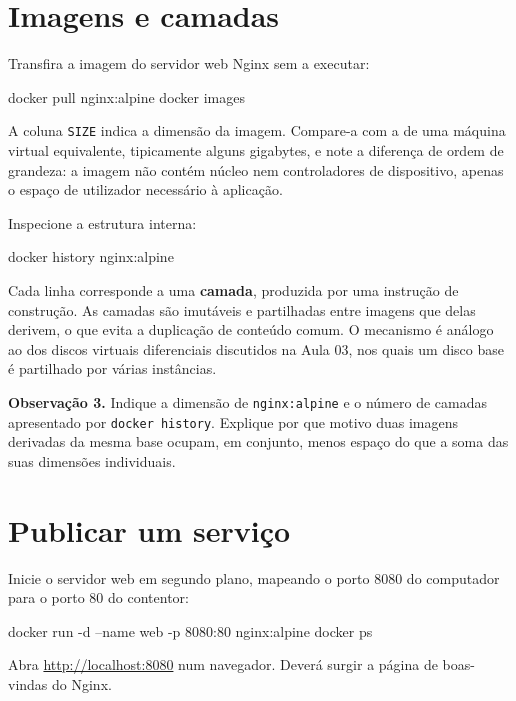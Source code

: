 \documentclass[11pt,a4paper]{article}
\begin{document}
\section{Imagens e camadas}

Transfira a imagem do servidor web Nginx sem a executar:

\begin{terminal}
docker pull nginx:alpine
docker images
\end{terminal}

A coluna \texttt{SIZE} indica a dimensão da imagem. Compare-a com a de uma máquina virtual equivalente, tipicamente alguns gigabytes, e note a diferença de ordem de grandeza: a imagem não contém núcleo nem controladores de dispositivo, apenas o espaço de utilizador necessário à aplicação.

Inspecione a estrutura interna:

\begin{terminal}
docker history nginx:alpine
\end{terminal}

Cada linha corresponde a uma \textbf{camada}, produzida por uma instrução de construção. As camadas são imutáveis e partilhadas entre imagens que delas derivem, o que evita a duplicação de conteúdo comum. O mecanismo é análogo ao dos discos virtuais diferenciais discutidos na Aula 03, nos quais um disco base é partilhado por várias instâncias.

\begin{registo}
\textbf{Observação 3.} Indique a dimensão de \texttt{nginx:alpine} e o número de camadas apresentado por \texttt{docker history}. Explique por que motivo duas imagens derivadas da mesma base ocupam, em conjunto, menos espaço do que a soma das suas dimensões individuais.
\end{registo}

\section{Publicar um serviço}

Inicie o servidor web em segundo plano, mapeando o porto 8080 do computador para o porto 80 do contentor:

\begin{terminal}
docker run -d --name web -p 8080:80 nginx:alpine
docker ps
\end{terminal}

Abra \url{http://localhost:8080} num navegador. Deverá surgir a página de boas-vindas do Nginx.
\end{document}
